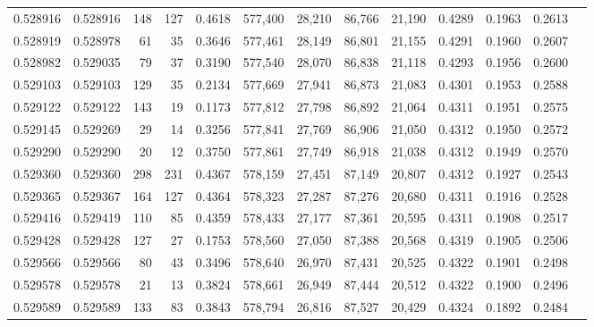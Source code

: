 \begin{tabular}{rrrrrrrrrrrrr}
0.528916 & 0.528916 &   148 &   127 &                                     0.4618 & 577,400 &  28,210 &  86,766 &  21,190 & 0.4289 & 0.1963 & 0.2613 \\
0.528919 & 0.528978 &    61 &    35 &                                     0.3646 & 577,461 &  28,149 &  86,801 &  21,155 & 0.4291 & 0.1960 & 0.2607 \\
0.528982 & 0.529035 &    79 &    37 &                                     0.3190 & 577,540 &  28,070 &  86,838 &  21,118 & 0.4293 & 0.1956 & 0.2600 \\
0.529103 & 0.529103 &   129 &    35 &                                     0.2134 & 577,669 &  27,941 &  86,873 &  21,083 & 0.4301 & 0.1953 & 0.2588 \\
0.529122 & 0.529122 &   143 &    19 &                                     0.1173 & 577,812 &  27,798 &  86,892 &  21,064 & 0.4311 & 0.1951 & 0.2575 \\
0.529145 & 0.529269 &    29 &    14 &                                     0.3256 & 577,841 &  27,769 &  86,906 &  21,050 & 0.4312 & 0.1950 & 0.2572 \\
0.529290 & 0.529290 &    20 &    12 &                                     0.3750 & 577,861 &  27,749 &  86,918 &  21,038 & 0.4312 & 0.1949 & 0.2570 \\
0.529360 & 0.529360 &   298 &   231 &                                     0.4367 & 578,159 &  27,451 &  87,149 &  20,807 & 0.4312 & 0.1927 & 0.2543 \\
0.529365 & 0.529367 &   164 &   127 &                                     0.4364 & 578,323 &  27,287 &  87,276 &  20,680 & 0.4311 & 0.1916 & 0.2528 \\
0.529416 & 0.529419 &   110 &    85 &                                     0.4359 & 578,433 &  27,177 &  87,361 &  20,595 & 0.4311 & 0.1908 & 0.2517 \\
0.529428 & 0.529428 &   127 &    27 &                                     0.1753 & 578,560 &  27,050 &  87,388 &  20,568 & 0.4319 & 0.1905 & 0.2506 \\
0.529566 & 0.529566 &    80 &    43 &                                     0.3496 & 578,640 &  26,970 &  87,431 &  20,525 & 0.4322 & 0.1901 & 0.2498 \\
0.529578 & 0.529578 &    21 &    13 &                                     0.3824 & 578,661 &  26,949 &  87,444 &  20,512 & 0.4322 & 0.1900 & 0.2496 \\
0.529589 & 0.529589 &   133 &    83 &                                     0.3843 & 578,794 &  26,816 &  87,527 &  20,429 & 0.4324 & 0.1892 & 0.2484 \\

\end{tabular}
